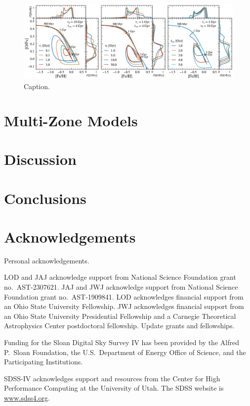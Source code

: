 \documentclass[twocolumn,twocolappendix,linenumbers]{aastex631}
\newcommand{\todo}[1]{{\color{red}#1}}
\begin{document}
\begin{figure}
    \centering
    \includegraphics{figures/onezone_params.pdf}
    \caption{Caption.}
    \label{fig:onezone-params}
\end{figure}

\section{Multi-Zone Models}
\label{sec:multizone-results}

\section{Discussion}
\label{sec:discussion}

\section{Conclusions}
\label{sec:conclusions}

\section*{Acknowledgements}

\todo{Personal acknowledgements.}

LOD and JAJ acknowledge support from National Science Foundation grant no.\ AST-2307621. JAJ and JWJ acknowledge support from National Science Foundation grant no.\ AST-1909841.
LOD acknowledges financial support from an Ohio State University Fellowship.
JWJ acknowledges financial support from an Ohio State University Presidential Fellowship and a Carnegie Theoretical Astrophysics Center postdoctoral fellowship. \todo{Update grants and fellowships.}

Funding for the Sloan Digital Sky 
Survey IV has been provided by the 
Alfred P.\ Sloan Foundation, the U.S.\ 
Department of Energy Office of 
Science, and the Participating 
Institutions. 

SDSS-IV acknowledges support and 
resources from the Center for High 
Performance Computing  at the 
University of Utah. The SDSS 
website is \url{www.sdss4.org}.
\end{document}
